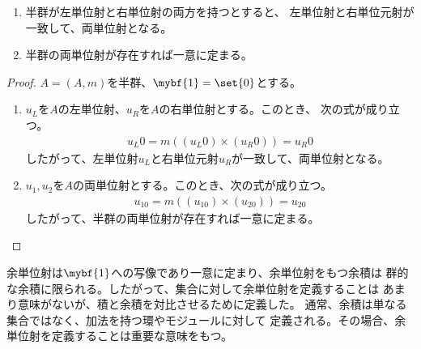	\begin{proposition}[単位射の一意性]\label{prop:単位射の一意性} %
		\begin{enumerate}
			\item 半群が左単位射と右単位射の両方を持つとすると、
			左単位射と右単位元射が一致して、両単位射となる。
			\item 半群の両単位射が存在すれば一意に定まる。
		\end{enumerate}
	\end{proposition} %
	\begin{proof} %
		$A=(A,m)$を半群、$\mybf{1}=\set{0}$とする。
		\begin{enumerate}
			\item $u_L$を$A$の左単位射、$u_R$を$A$の右単位射とする。このとき、
			次の式が成り立つ。
			\begin{equation*}\begin{split}
				u_L0 = m((u_L0)\times (u_R0)) = u_R0
			\end{split}\end{equation*}
			したがって、左単位射$u_L$と右単位元射$u_R$が一致して、両単位射となる。
			\item $u_1,u_2$を$A$の両単位射とする。このとき、次の式が成り立つ。
			\begin{equation*}\begin{split}
				u_10 = m((u_10)\times (u_20)) = u_20
			\end{split}\end{equation*}
			したがって、半群の両単位射が存在すれば一意に定まる。
		\end{enumerate}
	\end{proof} %

	余単位射は$\mybf{1}$への写像であり一意に定まり、余単位射をもつ余積は
	群的な余積に限られる。したがって、集合に対して余単位射を定義することは
	あまり意味がないが、積と余積を対比させるために定義した。
	通常、余積は単なる集合ではなく、加法を持つ環やモジュールに対して
	定義される。その場合、余単位射を定義することは重要な意味をもつ。

